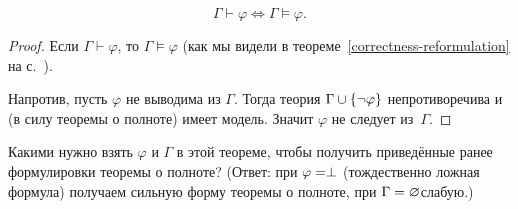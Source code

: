 \begin{theorem}
        \label{semantics-provability}%
        $$
\Gamma\vdash \varphi \Leftrightarrow \Gamma\vDash \varphi.
        $$
\end{theorem}

\begin{proof}
Если $\Gamma\vdash\varphi$, то $\Gamma\vDash\varphi$ (как мы
видели в теореме~\ref{correctness-reformulation} на
с.~\pageref{correctness-reformulation}).

Напротив, пусть $\varphi$ не выводима из $\Gamma$. Тогда
теория $\Gamma\hm\cup\{\lnot\varphi\}$ непротиворечива
и (в силу теоремы о полноте) имеет модель. Значит $\varphi$
не следует из~$\Gamma$.
\end{proof}

\begin{problem}
Какими нужно взять $\varphi$ и $\Gamma$ в этой теореме, чтобы
получить приведённые ранее формулировки теоремы о полноте?
(Ответ: при $\varphi\hm=\perp$ (тождественно ложная формула)
получаем сильную форму теоремы о полноте, при
$\Gamma\hm=\varnothing$\т слабую.)
\end{problem}
